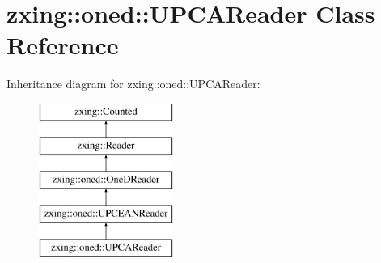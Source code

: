 \hypertarget{classzxing_1_1oned_1_1_u_p_c_a_reader}{}\section{zxing\+:\+:oned\+:\+:U\+P\+C\+A\+Reader Class Reference}
\label{classzxing_1_1oned_1_1_u_p_c_a_reader}
Inheritance diagram for zxing\+:\+:oned\+:\+:U\+P\+C\+A\+Reader\+:\begin{figure}[H]
\begin{center}
\leavevmode
\includegraphics[height=5.000000cm]{classzxing_1_1oned_1_1_u_p_c_a_reader}
\end{center}
\end{figure}
